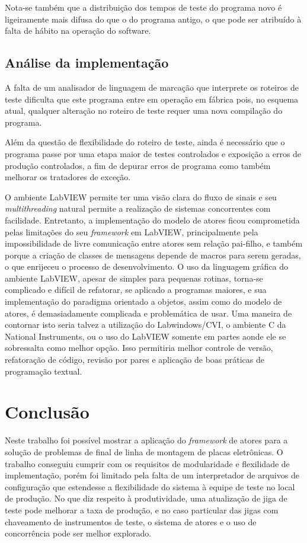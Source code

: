     Nota-se também que a distribuição dos tempos de teste do programa novo é ligeiramente mais difusa do que o do programa antigo, o que pode ser atribuído à falta de hábito na operação do software.

\section{Análise da implementação}

    A falta de um analisador de linguagem de marcação que interprete os roteiros de teste dificulta que este programa entre em operação em fábrica pois, no esquema atual, qualquer alteração no roteiro de teste requer uma nova compilação do programa.
    
    Além da questão de flexibilidade do roteiro de teste, ainda é necessário que o programa passe por uma etapa maior de testes controlados e exposição a erros de produção controlados, a fim de depurar erros de programa como também melhorar os tratadores de exceção.
   
    O ambiente LabVIEW permite ter uma visão clara do fluxo de sinais e seu \textit{multithreading} natural permite a realização de sistemas concorrentes com facilidade. Entretanto, a implementação do modelo de atores ficou comprometida pelas limitações do seu \textit{framework} em LabVIEW, principalmente pela impossibilidade de livre comunicação entre atores sem relação pai-filho, e também porque a criação de classes de mensagens depende de macros para serem geradas, o que enrijeceu o processo de desenvolvimento. O uso da linguagem gráfica do ambiente LabVIEW, apesar de simples para pequenas rotinas, torna-se complicado e difícil de refatorar, se aplicado a programas maiores, e sua implementação do paradigma orientado a objetos, assim como do modelo de atores, é demasiadamente complicada e problemática de usar.
    Uma maneira de contornar isto seria talvez a utilização do Labwindows/CVI, o ambiente C da National Instruments, ou o uso do LabVIEW somente em partes aonde ele se sobressalta como melhor opção. Isso permitiria melhor controle de versão, refatoração de código, revisão por pares e aplicação de boas práticas de programação textual. 
    
   
\chapter{Conclusão}
\label{conclusao}

    Neste trabalho foi possível mostrar a aplicação do \textit{framework} de atores para a solução de problemas de final de linha de montagem de placas eletrônicas. O trabalho conseguiu cumprir com os requisitos de modularidade e flexilidade de implementação, porém foi limitado pela falta de um interpretador de arquivos de configuração que estendesse a flexibilidade do sistema à equipe de teste no local de produção. No que diz respeito à produtividade, uma atualização de jiga de teste pode melhorar a taxa de produção, e no caso particular das jigas com chaveamento de instrumentos de teste, o sistema de atores e o uso de concorrência pode ser melhor explorado.
    
